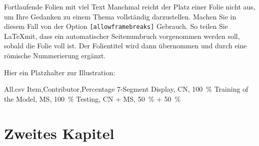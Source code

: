 \documentclass[aspectratio=169]{beamer} %
\begin{document}
\begin{frame}{Fortlaufende Folien mit viel Text} %
Manchmal reicht der Platz einer Folie nicht aus, um Ihre Gedanken zu einem Thema vollständig darzustellen. Machen Sie in diesem Fall von der Option \verb|[allowframebreaks]| Gebrauch. So teilen Sie \LaTeX mit, dass ein automatischer Seitenumbruch vorgenommen werden soll, sobald die Folie voll ist. Der Folientitel wird dann übernommen und durch eine römische Nummerierung ergänzt.\\

\bigskip

Hier ein Platzhalter zur Illustration: \textcolor[rgb]{0.4,0.4,0.4}{\lipsum[1-2]}

\bigskip

\begin{filecontents}{All.csv}
Item,Contributor,Percentage
7-Segment Display, CN, 100~\%
Training of the Model, MS, 100~\%
Testing, CN + MS, 50~\% + 50~\%
\end{filecontents}


\mytableAll %

\begin{table}
    \centering
    \caption{Individual contribution: Markus Steinle (MS), Christopher Neumann (CN).}
    \label{tab:All}
    \pgfplotstabletypeset[
        col sep=space,           %
        header=true,             %
        string type,             %
        columns/Value/.style={
        postproc cell content/.style={
            @cell content={##1 (kB)} 
        }
    },
    columns/Ticks/.style={
        postproc cell content/.style={
            @cell content={##1 (ns)}
        }
    },
        every even row/.style={
            before row={\rowcolor{Lightgrey}}
        },
        every head row/.style={
            before row=\toprule,after row=\midrule
        },
        every last row/.style={
            after row=\bottomrule
        }
        ]
        {\mytableAll}
\end{table}

\end{frame}

\section{Zweites Kapitel}
\end{document}
